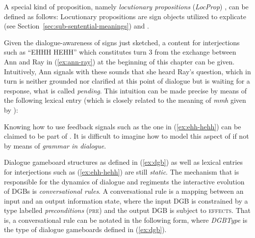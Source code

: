 \documentclass[output=paper
 	        ,biblatex
                ,babelshorthands
                ,newtxmath
                ,draftmode
                ,colorlinks, citecolor=brown
]{langscibook}
\begin{document}
A special kind of proposition, namely \emph{locutionary propositions} (\emph{LocProp}) \citep[]{Ginzburg:2012}, can be defined as follows:
%
\ea \label{ex:locprop}
\z
%
Locutionary propositions are sign objects utilized to explicate  (see Section~\ref{sec:sub-sentential-meanings}) and . 

Given the dialogue-awareness of signs just sketched, a content for interjections such as \enquote{EHHH HEHH} which constitutes turn 3 from the exchange between Ann and Ray in (\ref{ex:ann-ray}) at the beginning of this chapter can be given.
%
Intuitively, Ann signals with these sounds that she heard Ray's question, which in turn is neither grounded nor clarified at this point of dialogue but is waiting for a response, what is called \emph{pending}.
%
This intuition can be made precise by means of the following lexical entry (which is closely related to the meaning of \textit{mmh} given by \citealt[]{Ginzburg:2012}):
%
\ea \label{ex:ehh-hehh}
\avm{
[phon & : < \phonfont{ehh hehh} > \\
cat & :	[head=\type{interjection} & : syncat ] \\
dgb-params & :	[spkr & : Ind \\
              	addr & : Ind \\
              	pending & : LocProp \\
              	c2 & : address!({\normalfont\textsc{spkr}, \textsc{addr}, \textsc{pending}})! ] \\
\punk{cont=\type{Understand}(spkr, addr, dgb-params.pending)}{: IllocProp} ]
}
\z

Knowing how  to use feedback signals such as the one in (\ref{ex:ehh-hehh}) can be claimed to be part of .
%
It is difficult to imagine how to model this aspect of  if not by means of \emph{grammar in dialogue}.


Dialogue gameboard structures as defined in (\ref{ex:dgb}) as well as lexical entries for interjections such as (\ref{ex:ehh-hehh}) are still \emph{static}.
%
The mechanism that is responsible for the dynamics of dialogue and regiments the interactive evolution of DGBs is \emph{conversational rules}.
%
A conversational rule is a mapping between an input and an output information state, where the input DGB is constrained by a type labelled \emph{preconditions} (\textsc{pre}) and the output DGB is subject to \textsc{effects}.
%
That is, a conversational rule can be notated in the following form, where \emph{DGBType} is the type of dialogue gameboards defined in (\ref{ex:dgb}).
%
\ea \label{ex:pre-effect}
\z
\end{document}
